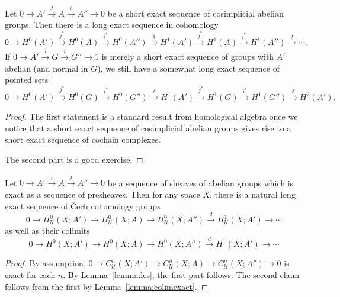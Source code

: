 \documentclass[a4paper,openany]{scrbook}
\begin{document}
\begin{lemma}\label{lemma:les}
Let $0 \to A' \xrightarrow{j} A \xrightarrow{i} A'' \to 0$ be a short exact sequence of cosimplicial abelian groups. Then there is a long exact sequence in cohomology
\[
0 \to H^0(A') \xrightarrow{j^*} H^0(A) \xrightarrow{i^*} H^0(A'') \xrightarrow{\delta} H^1(A') \xrightarrow{j^*} H^1(A) \xrightarrow{i^*} H^1(A'') \xrightarrow{\delta} \cdots.
\]
If $0 \to A' \xrightarrow{j} G \xrightarrow{i} G'' \to 1$ is merely a short exact sequence of groups with $A'$ abelian (and normal in $G$), we still have a somewhat long exact sequence of pointed sets
\[
0 \to H^0(A') \xrightarrow{j^*} H^0(G) \xrightarrow{i^*} H^0(G'') \xrightarrow{\delta} H^1(A') \xrightarrow{j^*} H^1(G) \xrightarrow{i^*} H^1(G'') \xrightarrow{\delta} H^2(A').
\]
\end{lemma}
\begin{proof}
The first statement is a standard result from homological algebra once we notice that a short exact sequence of cosimplicial abelian groups gives rise to a short exact sequence of cochain complexes.

The second part is a good exercise.
\end{proof}

\begin{corollary} \label{cor:lesfromsesofsheaves}
Let $0 \to A' \xrightarrow{i} A \xrightarrow{j} A'' \to 0$ be a sequence of sheaves of abelian groups which is exact as a sequence of presheaves. 
Then for any space $X$, there is a natural long exact sequence of Čech cohomology groups
\[
0 \to H^0_{\mathcal U}(X;A') \to H^0_{\mathcal U}(X;A) \to H^0_{\mathcal U}(X;A'') \xrightarrow{d} H^1_{\mathcal U}(X;A') \to \cdots
\]
as well as their colimits
\[
0 \to H^0(X;A') \to H^0(X;A) \to H^0(X;A'') \xrightarrow{d} H^1(X;A') \to \cdots
\]
\end{corollary}
\begin{proof}
By assumption, $0 \to C^n_{\mathcal U}(X;A') \to C^n_{\mathcal U}(X;A) \to C^n_{\mathcal U}(X;A'') \to 0$ is exact for each $n$. By Lemma~\ref{lemma:les}, the first part follows. The second claim follows from the first by Lemma~\ref{lemma:colimexact}.
\end{proof}
\end{document}
